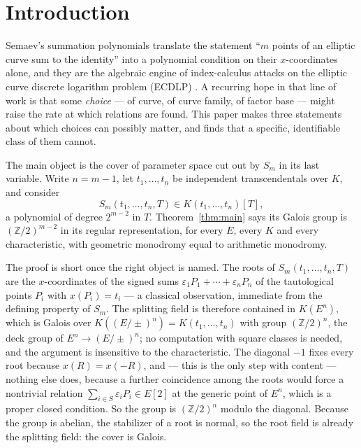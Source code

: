 \documentclass[11pt,a4paper]{article}
\theoremstyle{plain}
\theoremstyle{definition}
\newcommand{\ZZ}{\mathbb{Z}}
\newcommand{\eps}{\varepsilon}
\begin{document}
\tableofcontents

\section{Introduction}

Semaev's summation polynomials \cite{semaev2004} translate the statement
``$m$ points of an elliptic curve sum to the identity'' into a polynomial
condition on their $x$-coordinates alone, and they are the algebraic engine of
index-calculus attacks on the elliptic curve discrete logarithm problem
(ECDLP) \cite{gaudry2009,diem2011,fghr2014}. A recurring hope in that line of
work is that some \emph{choice} --- of curve, of curve family, of factor base ---
might raise the rate at which relations are found. This paper makes three
statements about which choices can possibly matter, and finds that a specific,
identifiable class of them cannot.

The main object is the cover of parameter space cut out by $S_m$ in its last
variable. Write $n = m-1$, let $t_1,\dots,t_n$ be independent transcendentals
over $K$, and consider
\[
  S_m(t_1,\dots,t_n,T) \in K(t_1,\dots,t_n)[T],
\]
a polynomial of degree $2^{m-2}$ in $T$. Theorem~\ref{thm:main} says its Galois
group is $(\ZZ/2)^{m-2}$ in its regular representation, for every $E$, every $K$
and every characteristic, with geometric monodromy equal to arithmetic monodromy.

The proof is short once the right object is named. The roots of
$S_m(t_1,\dots,t_n,T)$ are the $x$-coordinates of the signed sums
$\eps_1 P_1 + \cdots + \eps_n P_n$ of the tautological points $P_i$ with
$x(P_i) = t_i$ --- a classical observation, immediate from the defining property
of $S_m$. The splitting field is therefore contained in $K(E^n)$, which is Galois
over $K((E/{\pm})^n) = K(t_1,\dots,t_n)$ with group $(\ZZ/2)^n$, the deck group of
$E^n \to (E/{\pm})^n$; no computation with square classes is needed, and the
argument is insensitive to the characteristic. The diagonal $-1$ fixes every root
because $x(R) = x(-R)$, and --- this is the only step with content --- nothing else
does, because a further coincidence among the roots would force a nontrivial
relation $\sum_{i \in S} \eps_i P_i \in E[2]$ at the generic point of $E^n$, which
is a proper closed condition. So the group is $(\ZZ/2)^n$ modulo the diagonal.
Because the group is abelian, the stabilizer of a root is normal, so the root
field is already the splitting field: the cover is Galois.
\end{document}
